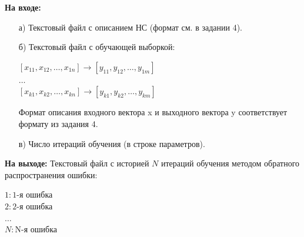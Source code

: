 \documentclass[bachelor, och, otchet]{template}
\begin{document}
        \textbf{На входе:}
        
            \begin{itemize}
                \item[а)] Текстовый файл с описанием НС (формат см. в задании 4).
                \item[б)] Текстовый файл с обучающей выборкой:
                
                    \begin{center}
                        $[x_{11}, x_{12}, \dots, x_{1n}] \rightarrow [y_{11}, y_{12}, \dots, y_{1m}]$ \\
                        $\dots$\\
                        $[x_{k1}, x_{k2}, \dots, x_{kn}] \rightarrow [y_{k1}, y_{k2}, \dots, y_{km}]$ \\
                    \end{center}
                    Формат описания входного вектора x и выходного вектора y соответствует формату из задания 4. 
                \item[в)] Число итераций обучения (в строке параметров).

            \end{itemize}

        \textbf{На выходе:} Текстовый файл с историей $N$ итераций обучения методом обратного распространения ошибки:
            \begin{center}
                $1 : \text{1-я ошибка}$ \\
                $2 : \text{2-я ошибка}$ \\
                    $\dots$\\
                $N : \text{N-я ошибка}$ \\

            \end{center}
\end{document}
